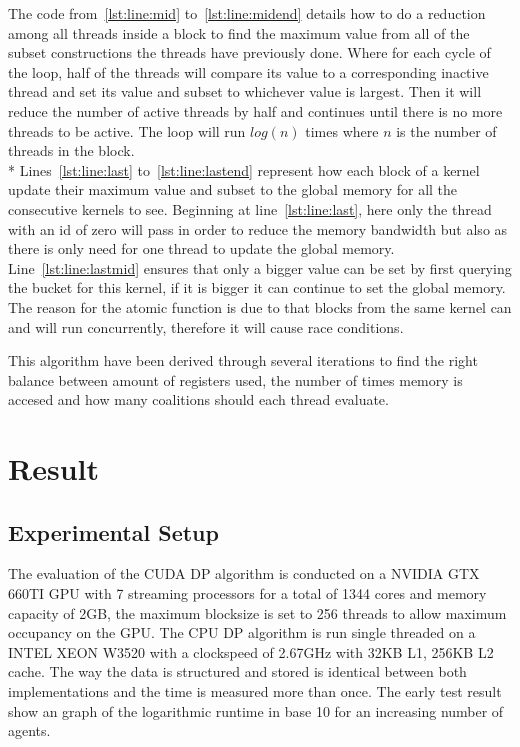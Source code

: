 \documentclass[a4paper, 12pt]{report}
\begin{document}
The code from~\ref{lst:line:mid} to~\ref{lst:line:midend} details how to do a reduction among all threads inside a block to find the maximum value from all of the subset constructions the threads have previously done. Where for each cycle of the loop, half of the threads will compare its value to a corresponding inactive thread and set its value and subset to whichever value is largest. Then it will reduce the number of active threads by half and continues until there is no more threads to be active. The loop will run $log(n)$ times where $n$ is the number of threads in the block.\\* Lines~\ref{lst:line:last} to~\ref{lst:line:lastend} represent how each block of a kernel update their maximum value and subset to the global memory for all the consecutive kernels to see. Beginning at line~\ref{lst:line:last}, here only the thread with an id of zero will pass in order to reduce the memory bandwidth but also as there is only need for one thread to update the global memory. Line~\ref{lst:line:lastmid} ensures that only a bigger value can be set by first querying the bucket for this kernel, if it is bigger it can continue to set the global memory. The reason for the atomic function is due to that blocks from the same kernel can and will run concurrently, therefore it will cause race conditions.

This algorithm have been derived through several iterations to find the right balance between amount of registers used, the number of times memory is accesed and how many coalitions should each thread evaluate. 
\section{Result}
\subsection{Experimental Setup}
The evaluation of the CUDA DP algorithm is conducted on a NVIDIA GTX 660TI GPU with 7 streaming processors for a total of 1344 cores and memory capacity of 2GB, the maximum blocksize is set to 256 threads to allow maximum occupancy on the GPU. The CPU DP algorithm is run single threaded on a INTEL XEON W3520 with a clockspeed of 2.67GHz with 32KB L1, 256KB L2 cache. The way the data is structured and stored is identical between both implementations and the time is measured more than once. The early test result show an graph of the logarithmic runtime in base 10 for an increasing number of agents.
\end{document}
